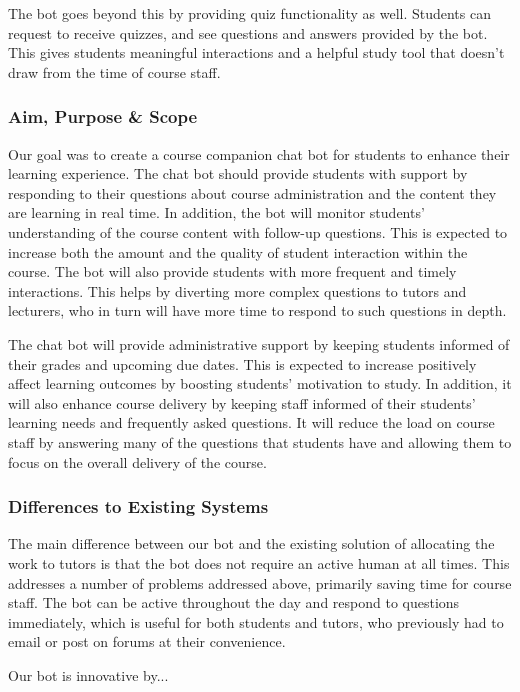 The bot goes beyond this by providing quiz functionality as well. Students can request to receive quizzes, and see questions and answers provided by the bot. This gives students meaningful interactions and a helpful study tool that doesn't draw from the time of course staff.

\subsubsection{Aim, Purpose \& Scope}
Our goal was to create a course companion chat bot for students to enhance their learning experience. The chat bot should provide students with support by responding to their questions about course administration and the content they are learning in real time. In addition, the bot will monitor students' understanding of the course content with follow-up questions. This is expected to increase both the amount and the quality of student interaction within the course. The bot will also provide students with more frequent and timely interactions. This helps by diverting more complex questions to tutors and lecturers, who in turn will have more time to respond to such questions in depth. 

The chat bot will provide administrative support by keeping students informed of their grades and upcoming due dates. This is expected to increase positively affect learning outcomes by boosting students' motivation to study. In addition, it will also enhance course delivery by keeping staff informed of their students' learning needs and frequently asked questions. It will reduce the load on course staff by answering many of the questions that students have and allowing them to focus on the overall delivery of the course. 

\subsubsection{Differences to Existing Systems}
The main difference between our bot and the existing solution of allocating the work to tutors is that the bot does not require an active human at all times. This addresses a number of problems addressed above, primarily saving time for course staff. The bot can be active throughout the day and respond to questions immediately, which is useful for both students and tutors, who previously had to email or post on forums at their convenience.

Our bot is innovative by... %

\newpage
